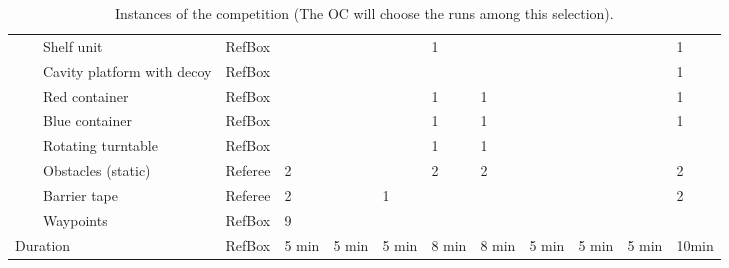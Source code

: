 \begin{landscape}
\begin{table}[h!]
\begin{tabular}{|l|l|l|l*{9}{|P{1cm}}|}
      &  & Shelf unit          & RefBox &       &       &       &   1   &       &       &       &   & 1   \\ \hhline{~~-----------}
&  & Cavity platform with decoy& RefBox &       &       &       &       &       &  \Y   &       &   & 1   \\ \hhline{~~-----------}
      &  & Red container       & RefBox &       &       &       &   1   &   1   &       &       &   & 1   \\ \hhline{~~-----------}
      &  & Blue container      & RefBox &       &       &       &   1   &   1   &       &       &   & 1   \\ \hhline{~~-----------}
      &  & Rotating turntable  & RefBox &       &       &       &   1   &   1   &       &       &   &    \\ 
    \hhline{-------------} \hhline{-------------}
     & 
     &     Obstacles (static) & Referee &  2    &       &       &   2   &   2   &       &       &   & 2   \\ \hhline{~~-----------}
     &   & Barrier tape       & Referee &  2    &       &   1   &       &       &       &       &   & 2   \\ \hhline{~~-----------}
     &   & Waypoints          & RefBox  &  9    &       &       &       &       &       &       &   &    \\ 
		\hline \hline
		 \multicolumn{3}{|l|}{Duration} 
		                    & RefBox & 5 min   & 5 min & 5 min  &  8 min &  8 min & 5 min & 5 min & 5 min & 10min \\
		\hline
 \end{tabular}
 \caption{Instances of the \RCAW \YEAR competition (The OC will choose the runs among this selection).}
 \label{tab:Instances}
\end{table}
\end{landscape}


